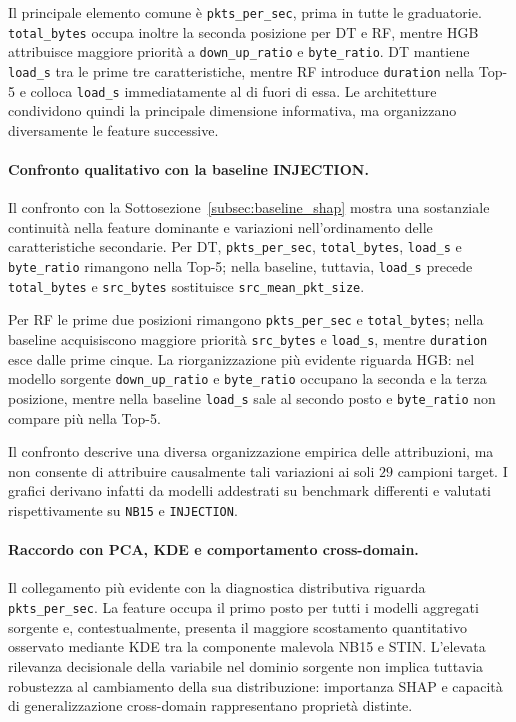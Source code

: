 Il principale elemento comune è \texttt{pkts\_per\_sec}, prima in tutte le graduatorie. 
\texttt{total\_bytes} occupa inoltre la seconda posizione per DT e RF, mentre HGB attribuisce maggiore priorità a \texttt{down\_up\_ratio} e \texttt{byte\_ratio}. 
DT mantiene \texttt{load\_s} tra le prime tre caratteristiche, mentre RF introduce \texttt{duration} nella Top-5 e colloca \texttt{load\_s} immediatamente al di fuori di essa. 
Le architetture condividono quindi la principale dimensione informativa, ma organizzano diversamente le feature successive.

\paragraph{Confronto qualitativo con la baseline INJECTION.}
Il confronto con la Sottosezione~\ref{subsec:baseline_shap} mostra una sostanziale continuità nella feature dominante e variazioni nell'ordinamento delle caratteristiche secondarie. 
Per DT, \texttt{pkts\_per\_sec}, \texttt{total\_bytes}, \texttt{load\_s} e \texttt{byte\_ratio} rimangono nella Top-5; nella baseline, tuttavia, \texttt{load\_s} precede \texttt{total\_bytes} e \texttt{src\_bytes} sostituisce \texttt{src\_mean\_pkt\_size}.

Per RF le prime due posizioni rimangono \texttt{pkts\_per\_sec} e \texttt{total\_bytes}; nella baseline acquisiscono maggiore priorità \texttt{src\_bytes} e \texttt{load\_s}, mentre \texttt{duration} esce dalle prime cinque. 
La riorganizzazione più evidente riguarda HGB: nel modello sorgente \texttt{down\_up\_ratio} e \texttt{byte\_ratio} occupano la seconda e la terza posizione, mentre nella baseline \texttt{load\_s} sale al secondo posto e \texttt{byte\_ratio} non compare più nella Top-5.

Il confronto descrive una diversa organizzazione empirica delle attribuzioni, ma non consente di attribuire causalmente tali variazioni ai soli $29$ campioni target. 
I grafici derivano infatti da modelli addestrati su benchmark differenti e valutati rispettivamente su \texttt{NB15} e \texttt{INJECTION}.

\paragraph{Raccordo con PCA, KDE e comportamento cross-domain.}
Il collegamento più evidente con la diagnostica distributiva riguarda \texttt{pkts\_per\_sec}. 
La feature occupa il primo posto per tutti i modelli aggregati sorgente e, contestualmente, presenta il maggiore scostamento quantitativo osservato mediante KDE tra la componente malevola NB15 e STIN. 
L'elevata rilevanza decisionale della variabile nel dominio sorgente non implica tuttavia robustezza al cambiamento della sua distribuzione: importanza SHAP e capacità di generalizzazione cross-domain rappresentano proprietà distinte.

